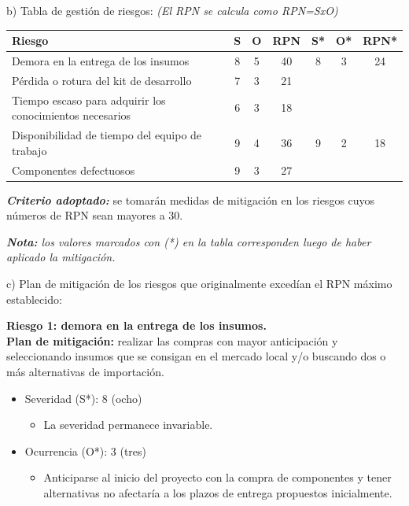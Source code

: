 \documentclass[
11pt, %
codirector, %
]{charter}
\begin{document}
b) Tabla de gestión de riesgos:      \textit{(El RPN se calcula como RPN=SxO)}

\begin{table}[htpb]
\centering
\begin{tabularx}{\linewidth}{@{}|X|c|c|c|c|c|c|@{}}
\hline
\rowcolor[HTML]{C0C0C0} 
Riesgo & S & O & RPN & S* & O* & RPN* \\ \hline
Demora en la entrega de los insumos                            &8  &5  &40   &8   &3   &24    \\ \hline
Pérdida o rotura del kit de desarrollo                         &7  &3  &21   &    &    &      \\ \hline
Tiempo escaso para adquirir los conocimientos necesarios       &6  &3  &18   &    &    &      \\ \hline
Disponibilidad de tiempo del equipo de trabajo                 &9  &4  &36   &9   &2   &18    \\ \hline
Componentes defectuosos                                        &9  &3  &27   &    &    &      \\ \hline
\end{tabularx}%
\end{table}

\textit{\textbf{Criterio adoptado:}} se tomarán medidas de mitigación en los riesgos cuyos números de RPN sean mayores a 30.

\textit{\textbf{Nota:} los valores marcados con (*) en la tabla corresponden luego de haber aplicado la mitigación.}

c) Plan de mitigación de los riesgos que originalmente excedían el RPN máximo establecido:
 
\textbf{Riesgo 1: demora en la entrega de los insumos.}\\
\textbf{Plan de mitigación:} realizar las compras con mayor anticipación y seleccionando insumos que se consigan en el mercado local y/o buscando dos o más alternativas de importación.
  \begin{itemize}
	\item Severidad (S*): 8 (ocho)
        \begin{itemize}
			\item La severidad permanece invariable.
		\end{itemize}
	\item Ocurrencia (O*): 3 (tres)
        \begin{itemize}
			\item Anticiparse al inicio del proyecto con la compra de componentes y tener alternativas no afectaría a los plazos de entrega propuestos inicialmente.
		\end{itemize}
	\end{itemize}
\end{document}
